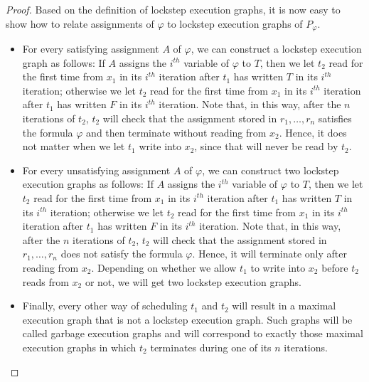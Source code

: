 \documentclass[acmsmall]{acmart}
\begin{document}
\begin{proof}
    Based on the definition of lockstep execution graphs, it is now easy to
    show how to relate assignments of $\varphi$ to lockstep execution graphs
    of $P_\varphi$.
    \begin{itemize}
        \item For every satisfying assignment $A$ of $\varphi$, we can construct 
        a lockstep execution graph as follows: If $A$ assigns the $i^{th}$ variable of $\varphi$ to $T$, then we let $t_2$ read for the first time from $x_1$ in its $i^{th}$ iteration after $t_1$ has written $T$ in its $i^{th}$ iteration; otherwise we let $t_2$ read for the first time from $x_1$ in its $i^{th}$ iteration
        after $t_1$ has written $F$ in its $i^{th}$ iteration. Note that, in this way, after the $n$ iterations of $t_2$, $t_2$ will check that the assignment stored in $r_1,\dots,r_n$ satisfies the formula $\varphi$ and then terminate without reading from $x_2$. Hence, it does not matter when we let $t_1$ write into $x_2$, since that will never be read by $t_2$. 

        \item For every unsatisfying assignment $A$ of $\varphi$, we can construct
        two lockstep execution graphs as follows: If $A$ assigns the $i^{th}$ variable of $\varphi$ to $T$, then we let $t_2$ read for the first time from $x_1$ in its $i^{th}$ iteration after $t_1$ has written $T$ in its $i^{th}$ iteration; otherwise we let $t_2$ read for the first time from $x_1$ in its $i^{th}$ iteration
        after $t_1$ has written $F$ in its $i^{th}$ iteration. Note that, in this way, after the $n$ iterations of $t_2$, $t_2$ will check that the assignment stored in $r_1,\dots,r_n$ does not satisfy the formula $\varphi$.
        Hence, it will terminate only after reading from $x_2$. Depending on whether
        we allow $t_1$ to write into $x_2$ before $t_2$ reads from $x_2$ or not, we will 
        get two lockstep execution graphs.

        \item Finally, every other way of scheduling $t_1$ and $t_2$ will result
        in a maximal execution graph that is not a lockstep execution graph. Such graphs
        will be called garbage execution graphs and will correspond to exactly
        those maximal execution graphs in which $t_2$ terminates during one of its $n$ iterations.
    \end{itemize}


\end{proof}
\end{document}
